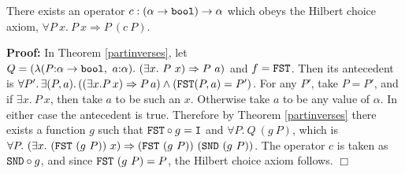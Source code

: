 \documentclass[envcountsame,runningheads]{llncs}
\begin{document}
\begin{theorem}
\label{hilbertchoice}
There exists an operator $c:(\alpha \rightarrow {\tt bool}) \rightarrow \alpha$
which obeys the Hilbert choice axiom,
$\forall P\ x.\ P\ x \Rightarrow P\ (c\ P)$.
\end{theorem}

{\bf Proof:}
In Theorem \ref{partinverses}, 
let $Q = (\lambda(P{\tt :}\alpha \rightarrow {\tt bool},\ a{\tt :}\alpha).\ 
                  (\exists x.\ P\ x) \Rightarrow P\ a)$
and $f = {\tt FST}$.  Then its antecedent is
$\forall P'.\, \exists (P,a).\, ((\exists x. P\, x) \Rightarrow P\, a) \wedge ({\tt FST} (P,a) = P')$.
For any $P'$,
take $P = P'$, and
if $\exists x.\ P\ x$,
then take $a$ to be such an $x$.
Otherwise take $a$ to be any value of $\alpha$.
In either case the antecedent is true.
Therefore
by Theorem \ref{partinverses} 
there exists a function $g$ such that
${\tt FST} \circ g = {\tt I}$
and
$\forall P.\ Q\ (g\ P)$,
which is
$\forall P.\ 
(\exists x.\ ({\tt FST}\ (g\ P))\ x) \Rightarrow ({\tt FST}\ (g\ P))\ ({\tt SND}\ (g\ P))$.
The operator $c$ is
taken as ${\tt SND} \circ g$,
and
since ${\tt FST}\ (g\ P) = P$,
the Hilbert choice axiom follows.
$\Box$

\begin{comment}
{\bf Proof:}
In Theorem \ref{partinverses}, 
take $Q = (\lambda(P{\tt :}\alpha \rightarrow {\tt bool},\ a{\tt :}\alpha).\ 
                  (\exists x.\ P\ x) \Rightarrow P\ a)$
and $f = {\tt FST}$.  Then its antecedent is
$\forall P.\ \exists (P,a).\ ((\exists x.\ P\ x) \Rightarrow P\ a) \wedge ({\tt FST} (P,a) = P)$.
For any $P$, if $\exists x.\ P\ x$,
then take $a$ to be such an $x$.
Otherwise take $a$ to be any value of $\alpha$.
In either case the antecedent is true.
Therefore there exists a function $g$ such that
${\tt FST} \circ g = {\tt I}$
and
$\forall P.\ {\bf let}\ (P,a) = g\ P\ {\bf in}\ ((\exists x.\ P\ x) \Rightarrow P\ a)$.
The operator $c$ is then taken as ${\tt SND} \circ g$,
and the Hilbert choice axiom follows.
$\Box$
\end{comment}
\end{document}
